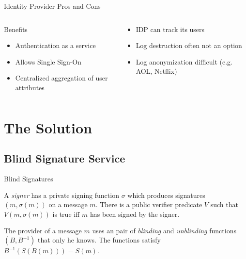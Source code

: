\documentclass[handout]{beamer}
\begin{document}
\begin{frame}{Identity Provider Pros and Cons}
  \begin{columns}[t]
    \begin{column}{5cm}
      {\LARGE{Benefits}}
        \begin{itemize}
          \item<1-> Authentication as a service
          \item<2-> Allows Single Sign-On
          \item<3-> Centralized aggregation of user attributes
        \end{itemize}
    \end{column}
    \begin{column}{5cm}
        \begin{itemize}
          \item<4-> IDP can track its users
          \item<5-> Log destruction often not an option
          \item<6-> Log anonymization difficult (e.g. AOL, Netflix)
        \end{itemize}
    \end{column}
  \end{columns}
\end{frame}

\section{The Solution}

\subsection{Blind Signature Service}

\begin{frame}{Blind Signatures}

\begin{definition}
A \emph{signer} has a private signing function $\sigma$ which produces
signatures $(m, \sigma(m))$ on a message $m$. There is a public verifier
predicate $V$ such that $V(m, \sigma(m))$ is true iff $m$ has been signed by the
signer.
\end{definition}


\begin{definition}
The provider of a message $m$ uses an pair of \emph{blinding} and
\emph{unblinding} functions $(B,B^{-1})$ that only he knows. The functions
satisfy $B^{-1}(S(B(m))) = S(m).$
\end{definition}

\end{frame}
\end{document}
